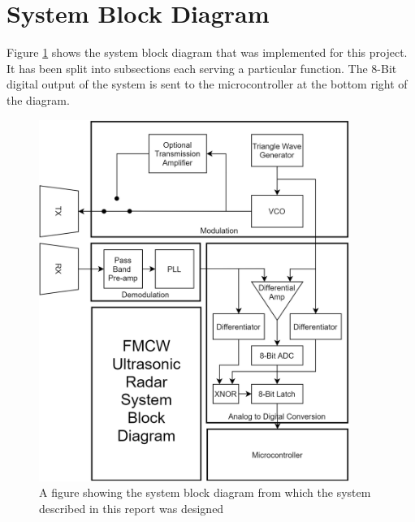 \section{System Block Diagram}
\label{sec:System Block Diagram}

Figure \ref{fig:systemBlockDiagram} shows the system block diagram that was implemented for this project. 
It has been split into subsections each serving a particular function.
The 8-Bit digital output of the system is sent to the microcontroller at the bottom right of the diagram. 

\begin{center}
    \begin{figure}[H]
        \includegraphics[width=0.9\textwidth]{../BlockDiagram/systemBlockDiagram.png}
        \caption{A figure showing the system block diagram from which the system described in this report was designed}
        \label{fig:systemBlockDiagram}
    \end{figure}
\end{center}